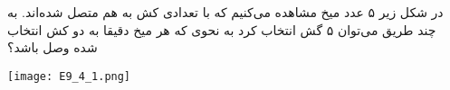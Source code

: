 در شکل زیر ۵ عدد میخ مشاهده می‌کنیم که با تعدادی کش به هم متصل شده‌اند. به چند طریق می‌توان ۵ گش انتخاب کرد به نحوی که هر میخ دقیقا به دو کش انتخاب شده وصل باشد؟
\begin{center}
  \texttt{[image: E9\_4\_1.png]}
\end{center}